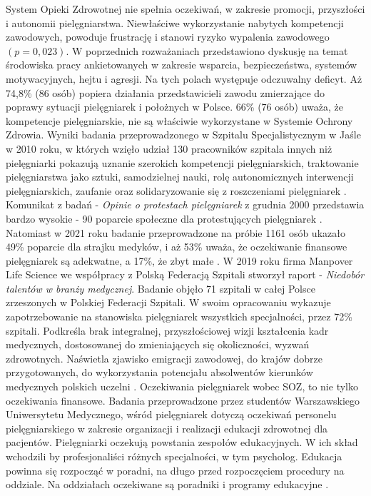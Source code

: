 \documentclass[a4paper,12pt,twoside,openright]{mwrep}
\begin{document}
System Opieki Zdrowotnej nie spełnia oczekiwań, w zakresie promocji, przyszłości i autonomii pielęgniarstwa. Niewłaściwe wykorzystanie nabytych kompetencji zawodowych, powoduje frustrację i stanowi ryzyko wypalenia zawodowego $(p = 0,023)$. W poprzednich rozważaniach przedstawiono dyskusję  na temat środowiska pracy ankietowanych w zakresie wsparcia, bezpieczeństwa, systemów motywacyjnych, hejtu  i agresji. Na tych polach występuje odczuwalny deficyt. Aż 74,8\%  (86 osób) popiera działania przedstawicieli zawodu zmierzające do poprawy sytuacji pielęgniarek i położnych w Polsce.  66\% (76 osób) uważa, że kompetencje pielęgniarskie, nie są właściwie wykorzystane w Systemie Ochrony Zdrowia. Wyniki badania przeprowadzonego w Szpitalu Specjalistycznym w Jaśle w 2010 roku, w których wzięło udział 130 pracowników szpitala innych niż pielęgniarki pokazują uznanie szerokich kompetencji pielęgniarskich, traktowanie pielęgniarstwa jako sztuki, samodzielnej nauki, rolę autonomicznych interwencji pielęgniarskich, zaufanie oraz solidaryzowanie się z roszczeniami pielęgniarek \cite{skorupska}. Komunikat z badań -  \textit{Opinie o protestach pielęgniarek} z grudnia 2000 przedstawia bardzo wysokie - 90  poparcie  społeczne dla protestujących pielęgniarek \cite{cebos}. Natomiast w 2021 roku badanie przeprowadzone na próbie 1161 osób ukazało 49\% poparcie dla strajku medyków, i aż 53\% uważa, że oczekiwanie finansowe pielęgniarek są adekwatne, a 17\%, że zbyt małe \cite{cebos2}. W 2019 roku firma Manpover Life Science we współpracy z Polską Federacją Szpitali stworzył raport - \textit{Niedobór talentów w branży medycznej}. Badanie objęło 71 szpitali w całej Polsce zrzeszonych w Polskiej Federacji Szpitali. W swoim opracowaniu wykazuje zapotrzebowanie na stanowiska pielęgniarek wszystkich specjalności, przez 72\% szpitali. Podkreśla brak integralnej, przyszłościowej wizji kształcenia kadr medycznych, dostosowanej do zmieniających się okoliczności, wyzwań zdrowotnych. Naświetla zjawisko emigracji zawodowej,  do krajów dobrze przygotowanych, do wykorzystania potencjału absolwentów kierunków medycznych polskich uczelni \cite{federacja}.
Oczekiwania pielęgniarek wobec SOZ, to nie tylko oczekiwania finansowe. Badania przeprowadzone przez studentów Warszawskiego Uniwersytetu Medycznego, wśród pielęgniarek dotyczą oczekiwań personelu pielęgniarskiego w zakresie organizacji i realizacji edukacji zdrowotnej dla pacjentów.  Pielęgniarki oczekują powstania zespołów edukacyjnych. W ich skład wchodzili by profesjonaliści różnych specjalności, w tym psycholog. Edukacja powinna się rozpocząć w poradni, na długo przed rozpoczęciem procedury na oddziale. Na oddziałach oczekiwane są poradniki i programy edukacyjne \cite{soz}.
\end{document}
